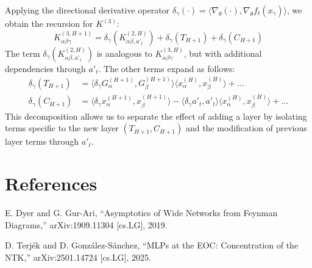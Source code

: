 \documentclass[11pt,a4paper]{article}
\theoremstyle{definition}
\begin{document}
Applying the directional derivative operator $\delta_\gamma(\cdot) = \langle \nabla_\theta (\cdot), \nabla_\theta f_t(x_\gamma) \rangle$, we obtain the recursion for $K^{(3)}$:
\begin{equation}
K^{(3, H+1)}_{\alpha\beta\gamma} = \delta_\gamma \left(K^{(2,H)}_{\alpha\beta, a'_t} \right) + \delta_\gamma(T_{H+1}) + \delta_\gamma(C_{H+1})
\end{equation}
The term $\delta_\gamma \left(K^{(2,H)}_{\alpha\beta, a'_t} \right)$ is analogous to $K^{(3,H)}_{\alpha\beta\gamma}$, but with additional dependencies through $a'_t$. The other terms expand as follows:
\begin{align}
\delta_\gamma(T_{H+1}) &= \langle \delta_\gamma G^{(H+1)}_\alpha, G^{(H+1)}_\beta \rangle \langle x^{(H)}_\alpha, x^{(H)}_\beta \rangle + \dots \\
\delta_\gamma(C_{H+1}) &= \langle \delta_\gamma x^{(H+1)}_\alpha, x^{(H+1)}_\beta \rangle - \langle \delta_\gamma a'_t, a'_t \rangle \langle x^{(H)}_\alpha, x^{(H)}_\beta \rangle + \dots
\end{align}
This decomposition allows us to separate the effect of adding a layer by isolating terms specific to the new layer $(T_{H+1}, C_{H+1})$ and the modification of previous layer terms through $a'_t$.

\newpage





\appendix
\section{References}

E. Dyer and G. Gur-Ari,
``Asymptotics of Wide Networks from Feynman Diagrams,''
arXiv:1909.11304 [cs.LG], 2019.

D. Terjék and D. González-Sánchez,
``MLPs at the EOC: Concentration of the NTK,''
arXiv:2501.14724 [cs.LG], 2025.
\end{document}
